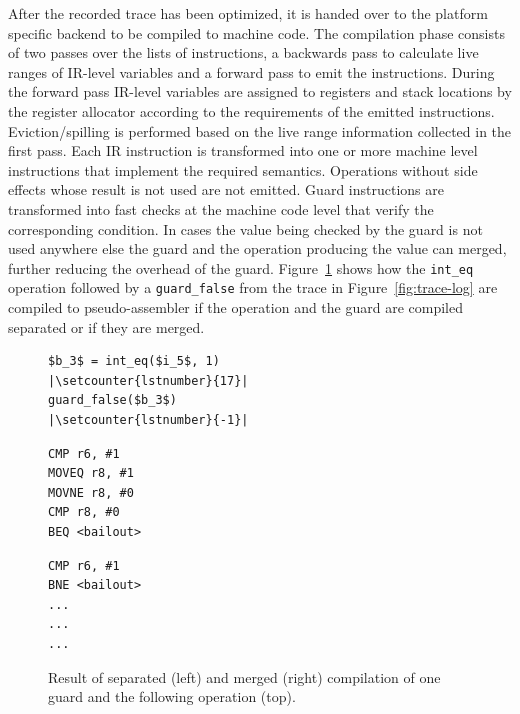 \documentclass[10pt,preprint]{sigplanconf}
\let\oldlstinline=\lstinline
\renewcommand\lstinline[1]{\oldlstinline[basicstyle=\ttfamily]{#1}}
\begin{document}
After the recorded trace has been optimized, it is handed over to the platform specific
backend to be compiled to machine code. The compilation phase consists of two
passes over the lists of instructions, a backwards pass to calculate live
ranges of IR-level variables and a forward pass to emit the instructions. During
the forward pass IR-level variables are assigned to registers and stack
locations by the register allocator according to the requirements of the
emitted instructions.  Eviction/spilling is performed based on the live range
information collected in the first pass. Each IR instruction is transformed
into one or more machine level instructions that implement the required
semantics. Operations without side effects whose result is not used are not
emitted. Guard instructions are transformed into fast checks at the machine
code level that verify the corresponding condition.  In cases the value being
checked by the guard is not used anywhere else the guard and the operation
producing the value can merged, further reducing the overhead of the guard.
Figure~\ref{fig:trace-compiled} shows how the \lstinline{int_eq} operation
followed by a \lstinline{guard_false} from the trace in Figure~\ref{fig:trace-log} are compiled to
pseudo-assembler if the operation and the guard are compiled separated or if
they are merged.

\begin{figure}[ht]
  \noindent
  \centering
  \begin{minipage}{1\columnwidth}
\begin{lstlisting}[xleftmargin=20pt,xrightmargin=20pt,framexleftmargin=5pt,framexrightmargin=-10pt,mathescape, numbers=right, escapechar=|, firstnumber=18,frame=b]
$b_3$ = int_eq($i_5$, 1)                    |\setcounter{lstnumber}{17}|
guard_false($b_3$)                          |\setcounter{lstnumber}{-1}|
\end{lstlisting}
  \end{minipage}
  \begin{minipage}{.40\columnwidth}
    \begin{lstlisting}
CMP r6, #1
MOVEQ r8, #1
MOVNE r8, #0
CMP r8, #0
BEQ <bailout>
    \end{lstlisting}
  \end{minipage}
  \hfill
  \begin{minipage}{.40\columnwidth}
    \begin{lstlisting}
CMP r6, #1
BNE <bailout>
...
...
...
    \end{lstlisting}
  \end{minipage}
  \caption{Result of separated (left) and merged (right) compilation of one guard and the following operation (top).}
  \label{fig:trace-compiled}
\end{figure}
\end{document}

